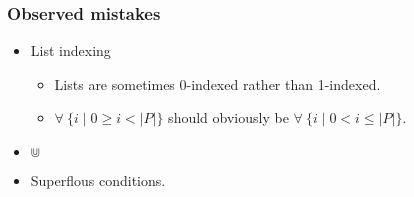 \begin{frame}

\frametitle{Observed mistakes}

\begin{itemize}

\item List indexing

\begin{itemize}

\item \bi Lists are sometimes 0-indexed rather than 1-indexed.

\item \bi $\forall\ \{i\mid 0\geq i < |P|\}$ should obviously be $\forall\
\{i\mid 0< i \leq |P|\}$.

\end{itemize}

\item $\Cup$

\item Superflous conditions.

\end{itemize}

\end{frame}

